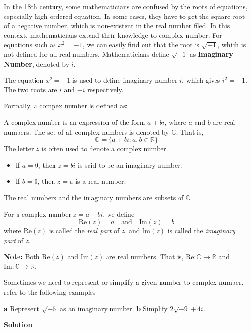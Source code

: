\documentclass[
	12pt, %
	fleqn, %
	a4paper, %
]{LegrandOrangeBook}
\begin{document}
In the 18th century, some mathematicians are confused by the roots of equations, especially  high-ordered equation.
In some cases, they have to get the square root of a negative number, which is non-existent in the real number filed.
In this context, mathematicians extend their knowledge to complex number. For equations such as $x^2 = -1$,
we can easily find out that the root is $\sqrt{-1}$, which is not defined for all real numbers. Mathematicians
define $\sqrt{-1}$ as \textbf{Imaginary Number}, denoted by $i$.
\begin{definition}
    The equation $x^2 = -1$ is used to define imaginary number $i$, which gives $i^2 = -1$. The two roots are $i$
    and $-i$ respectively.
\end{definition}

Formally, a compex number is defined as:
\begin{definition}
    A complex number is an expression of the form \(a + bi\), where \(a\) and \(b\) are real numbers.
The set of all complex numbers is denoted by \(\mathbb{C}\). That is,
\[
\mathbb{C} = \{ a + bi : a, b \in \mathbb{R} \}
\]
The letter \(z\) is often used to denote a complex number.
\begin{itemize}
    \item If \( a = 0 \), then \( z = bi \) is said to be an imaginary number.
    \item If \( b = 0 \), then \( z = a \) is a real number.
\end{itemize}
The real numbers and the imaginary numbers are subsets of \( \mathbb{C} \)
\end{definition}

\begin{definition} 
    For a complex number \( z = a + bi \), we define
\[
\text{Re}(z) = a \quad \text{and} \quad \text{Im}(z) = b
\]
where \(\text{Re}(z)\) is called the \textit{real part} of \(z\), and \(\text{Im}(z)\) is called the \textit{imaginary part} of \(z\).

\textbf{Note:} Both \(\text{Re}(z)\) and \(\text{Im}(z)\) are real numbers. That is, \(\text{Re}: \mathbb{C} \rightarrow \mathbb{R}\) and \(\text{Im}: \mathbb{C} \rightarrow \mathbb{R}\).
\end{definition}    
Sometimes we need to represent or simplify a given number to complex number. refer to the following examples
\begin{example}
    \textbf{a} Represent \(\sqrt{-5}\) as an imaginary number. \quad
    \textbf{b} Simplify \(2\sqrt{-9} + 4i\).
\end{example}
\textbf{Solution}
\end{document}
